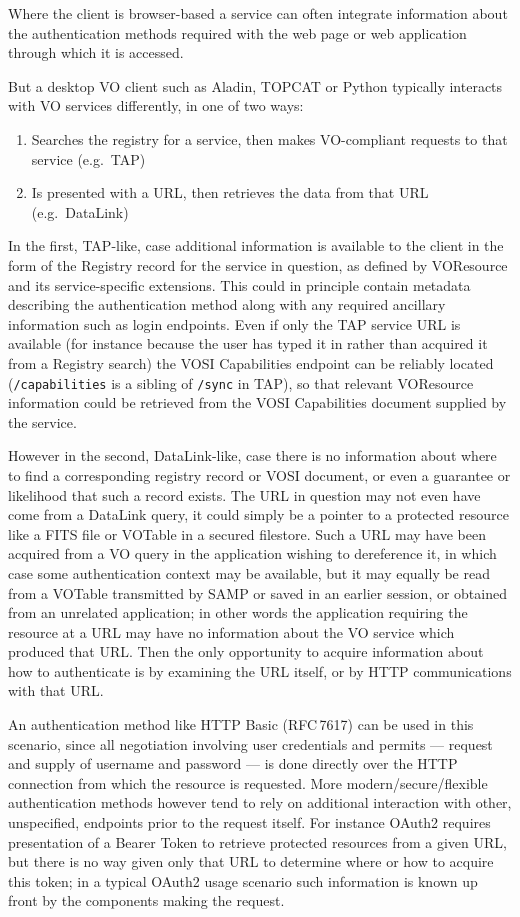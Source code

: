 \documentclass[11pt,a4paper]{ivoa}
\newcommand{\rfc}[1]{RFC\,#1}
\begin{document}
Where the client is browser-based
a service can often integrate information about the authentication
methods required with the web page or web application through which
it is accessed.

But a desktop VO client such as Aladin, TOPCAT or Python
typically interacts with VO services differently, in one of two
ways:
\begin{enumerate}
\item Searches the registry for a service, then makes VO-compliant
      requests to that service (e.g.\ TAP)
\item Is presented with a URL, then retrieves the data from that URL
      (e.g.\ DataLink)
\end{enumerate}
In the first, TAP-like, case additional information is available to the
client in the form of the Registry record for the service in question,
as defined by VOResource \citep{2008ivoa.spec.0222P}
and its service-specific extensions.
This could in principle contain metadata describing the authentication
method along with any required ancillary information such as
login endpoints.
Even if only the TAP service URL is available
(for instance because the user has typed it in rather than acquired it
from a Registry search) the VOSI Capabilities endpoint can be reliably
located ({\tt /capabilities} is a sibling of {\tt /sync} in TAP),
so that relevant VOResource information could be retrieved from the VOSI
Capabilities document supplied by the service.

However in the second, DataLink-like, case
there is no information about where to find a corresponding
registry record or VOSI document,
or even a guarantee or likelihood that such a record exists.
The URL in question may not even have come from a DataLink query,
it could simply be a pointer to a protected resource like a
FITS file or VOTable in a secured filestore.
Such a URL may have been acquired from a VO query in the application
wishing to dereference it, in which case some authentication context
may be available,
but it may equally be read from a VOTable transmitted by SAMP
or saved in an earlier session, or obtained from an unrelated application;
in other words the application requiring the resource at a URL may
have no information about the VO service which produced that URL.
Then the only opportunity to acquire information about how to authenticate
is by examining the URL itself, or by HTTP communications with that URL.

An authentication method like HTTP Basic (\rfc{7617})
can be used in this scenario,
since all negotiation involving user credentials and permits ---
request and supply of username and password ---
is done directly
over the HTTP connection from which the resource is requested.
More modern/secure/flexible authentication methods however tend to
rely on additional interaction with other, unspecified, endpoints
prior to the request itself.  For instance OAuth2 requires presentation
of a Bearer Token to retrieve protected resources from a given URL,
but there is no way given only that URL to determine where or how
to acquire this token;
in a typical OAuth2 usage scenario such information is known up front
by the components making the request.
\end{document}
